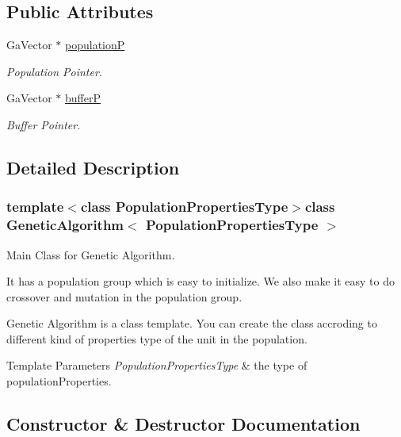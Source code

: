 \subsection*{Public Attributes}
\begin{DoxyCompactItemize}
\item 
Ga\+Vector $\ast$ \hyperlink{class_genetic_algorithm_a9ee5cb78bbc30596bceccb14143ec8e8}{populationP}
\begin{DoxyCompactList}\small\item\em Population Pointer. \end{DoxyCompactList}\item 
Ga\+Vector $\ast$ \hyperlink{class_genetic_algorithm_a74fdd6b9b2303018db89e0ad0eb77f02}{bufferP}
\begin{DoxyCompactList}\small\item\em Buffer Pointer. \end{DoxyCompactList}\end{DoxyCompactItemize}


\subsection{Detailed Description}
\subsubsection*{template$<$class Population\+Properties\+Type$>$class Genetic\+Algorithm$<$ Population\+Properties\+Type $>$}

Main Class for Genetic Algorithm. 

It has a population group which is easy to initialize. We also make it easy to do crossover and mutation in the population group.

Genetic Algorithm is a class template. You can create the class accroding to different kind of properties type of the unit in the population.


\begin{DoxyTemplParams}{Template Parameters}
{\em Population\+Properties\+Type} & the type of population\+Properties. \\
\hline
\end{DoxyTemplParams}


\subsection{Constructor \& Destructor Documentation}

